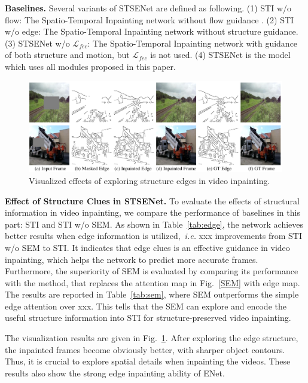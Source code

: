 \noindent \textbf{Baselines.} Several variants of STSENet are defined as following. (1) STI w/o flow: The Spatio-Temporal Inpainting network without flow guidance . (2) STI w/o edge: The Spatio-Temporal Inpainting network without structure guidance. (3) STSENet w/o $\mathcal{L}_{fec}$: The Spatio-Temporal Inpainting network with guidance of both structure and motion, but $\mathcal{L}_{fec}$ is not used. (4) STSENet is the model which uses all modules proposed in this paper. 



\begin{figure}[t]
	\centering
	\includegraphics[width=1.0\columnwidth]{edgevis} %
	\caption{Visualized effects of exploring structure edges in video inpainting.}
	\label{edgevis}
\end{figure}


\noindent \textbf{Effect of Structure Clues in STSENet.}
To evaluate the effects of structural information in video inpainting, we compare the performance of baselines in this part: STI and STI w/o SEM.
As shown in Table~\ref{tab:edge}, the network achieves better results when edge information is utilized,~\emph{i.e.} xxx improvements from STI w/o SEM to STI. It indicates that edge clues is an effective guidance in video inpainting, which helps the network to predict more accurate frames.
Furthermore, the superiority of SEM is evaluated by comparing its performance with the method, that replaces the attention map in Fig.~\ref{SEM} with edge map.
The results are reported in Table~\ref{tab:sem}, where SEM outperforms the simple edge attention over xxx.
This tells that the SEM can explore and encode the useful structure information into STI for structure-preserved video inpainting.

The visualization results are given in Fig.~\ref{edgevis}.
After exploring the edge structure, the inpainted frames become obviously better, with sharper object contours.
Thus, it is crucial to explore spatial details when inpainting the videos.
These results also show the strong edge inpainting ability of ENet.

